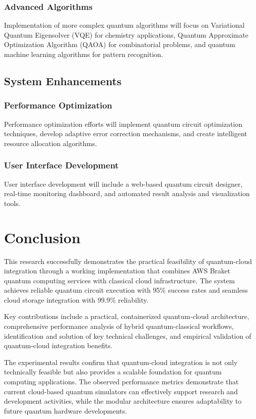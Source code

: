 \documentclass[onecolumn]{IEEEtran}
\begin{document}
\subsubsection{Advanced Algorithms}
Implementation of more complex quantum algorithms will focus on Variational Quantum Eigensolver (VQE) for chemistry applications, Quantum Approximate Optimization Algorithm (QAOA) for combinatorial problems, and quantum machine learning algorithms for pattern recognition.

\subsection{System Enhancements}

\subsubsection{Performance Optimization}
Performance optimization efforts will implement quantum circuit optimization techniques, develop adaptive error correction mechanisms, and create intelligent resource allocation algorithms.

\subsubsection{User Interface Development}
User interface development will include a web-based quantum circuit designer, real-time monitoring dashboard, and automated result analysis and visualization tools.

\section{Conclusion}

This research successfully demonstrates the practical feasibility of quantum-cloud integration through a working implementation that combines AWS Braket quantum computing services with classical cloud infrastructure. The system achieves reliable quantum circuit execution with 95\% success rates and seamless cloud storage integration with 99.9\% reliability.

Key contributions include a practical, containerized quantum-cloud architecture, comprehensive performance analysis of hybrid quantum-classical workflows, identification and solution of key technical challenges, and empirical validation of quantum-cloud integration benefits.

The experimental results confirm that quantum-cloud integration is not only technically feasible but also provides a scalable foundation for quantum computing applications. The observed performance metrics demonstrate that current cloud-based quantum simulators can effectively support research and development activities, while the modular architecture ensures adaptability to future quantum hardware developments.
\end{document}
